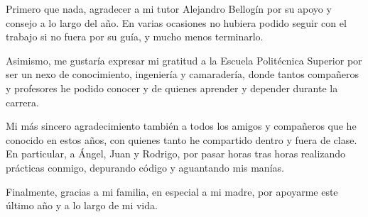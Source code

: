 Primero que nada, agradecer a mi tutor Alejandro Bellogín por su apoyo y consejo a lo largo del año. En varias ocasiones no hubiera podido seguir con el trabajo si no fuera por su guía, y mucho menos terminarlo.

Asimismo, me gustaría expresar mi gratitud a la Escuela Politécnica Superior por ser un nexo de conocimiento, ingeniería y camaradería, donde tantos compañeros y profesores he podido conocer y de quienes aprender y depender durante la carrera.

Mi más sincero agradecimiento también a todos los amigos y compañeros que he conocido en estos años, con quienes tanto he compartido dentro y fuera de clase. En particular, a Ángel, Juan y Rodrigo, por pasar horas tras horas realizando prácticas conmigo, depurando código y aguantando mis manías.

Finalmente, gracias a mi familia, en especial a mi madre, por apoyarme este último año y a lo largo de mi vida.